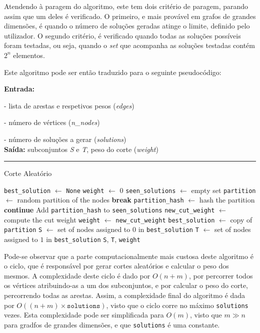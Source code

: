\documentclass[mirror, portugues]{revdetua}
\begin{document}
Atendendo à paragem do algoritmo, este tem dois critério de paragem, parando assim que um deles é verificado. O primeiro, e mais provável em grafos de grandes dimensões, é quando o número de soluções geradas atinge o limite, definido pelo utilizador. O segundo critério, é verificado quando todas as soluções possíveis foram testadas, ou seja, quando o \textit{set} que acompanha as soluções testadas contém $2^n$ elementos.

Este algoritmo pode ser então traduzido para o seguinte pseudocódigo:

\begin{algorithm}[H]
\raggedright
\textbf{Entrada:}

- lista de arestas e respetivos pesos (\textit{edges})

- número de vértices (\textit{n\_nodes})

- número de soluções a gerar (\textit{solutions})\\
\textbf{Saída:} subconjuntos \textit{S} e \textit{T}, peso do corte (\textit{weight}) \\
\hrule 
\caption{Corte Aleatório}
\begin{algorithmic}[1]
    \State \texttt{best\_solution} $\gets$ \texttt{None}
    \State \texttt{weight} $\gets$ 0
    \State \texttt{seen\_solutions} $\gets$ empty set
        \State \texttt{partition} $\gets$ random partition of the nodes
            \State \textbf{break}
        \EndIf
        \State \texttt{partition\_hash} $\gets$ hash the partition
            \State \textbf{continue}
        \EndIf
        \State Add \texttt{partition\_hash} to \texttt{seen\_solutions}
        \State \texttt{new\_cut\_weight} $\gets$ compute the cut weight
            \State \texttt{weight} $\gets$ \texttt{new\_cut\_weight}
            \State \texttt{best\_solution} $\gets$ copy of \texttt{partition}
        \EndIf
    \EndFor
    \State \texttt{S} $\gets$ set of nodes assigned to $0$ in \texttt{best\_solution}
    \State \texttt{T} $\gets$ set of nodes assigned to $1$ in \texttt{best\_solution}
    \Return \texttt{S}, \texttt{T}, \texttt{weight}
\end{algorithmic}
\end{algorithm}
    
Pode-se observar que a parte computacionalmente mais custosa deste algoritmo é o ciclo, que é responsável por gerar cortes aleatórios e calcular o peso dos mesmos. A complexidade deste ciclo é dado por $O(n + m)$, por percorrer todos os vértices atribuindo-as a um dos subconjuntos, e por calcular o peso do corte, percorrendo todas as arestas. Assim, a complexidade final do algoritmo é dada por $O((n + m) \times \texttt{solutions})$, visto que o ciclo corre no máximo \texttt{solutions} vezes. Esta complexidade pode ser simplificada para $O(m)$, visto que $m \gg n$ para gradfos de grandes dimensões, e que \texttt{solutions} é uma constante.
\end{document}
